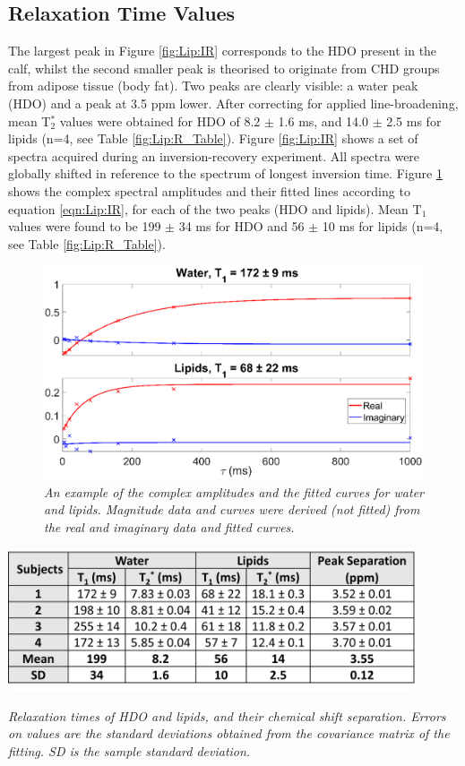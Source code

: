 \documentclass[class=article, crop=false]{standalone}
\begin{document}
\subsection{Relaxation Time Values}

The largest peak in Figure \ref{fig:Lip:IR} corresponds to the HDO present in the calf, whilst the second smaller peak is theorised to originate from CHD groups from adipose tissue (body fat). Two peaks are clearly visible: a water peak (HDO) and a peak at 3.5 ppm lower. After correcting for applied line-broadening, mean T$_2^*$ values were obtained for HDO of 8.2 $\pm$ 1.6 ms, and 14.0 $\pm$ 2.5 ms for lipids (n=4, see Table \ref{fig:Lip:R_Table}). Figure \ref{fig:Lip:IR} shows a set of spectra acquired during an inversion-recovery experiment. All spectra were globally shifted in reference to the spectrum of longest inversion time. Figure \ref{fig:Lip:Amp_Tau} shows the complex spectral amplitudes and their fitted lines according to equation \ref{eqn:Lip:IR}, for each of the two peaks (HDO and lipids). Mean T$_1$ values were found to be 199 $\pm$ 34 ms for HDO and 56 $\pm$ 10 ms for lipids (n=4, see Table \ref{fig:Lip:R_Table}).

\begin{figure}
    \centering
    \includegraphics[width=1\textwidth]{Figures/Lipid/Amp_Tau.png}
    \caption{\textit{An example of the complex amplitudes and the fitted curves for water and lipids. Magnitude data and curves were derived (not fitted) from the real and imaginary data and fitted curves.}}
    \label{fig:Lip:Amp_Tau}
\end{figure}

\begin{table}
    \centering
    \includegraphics[width=0.9\textwidth]{Figures/Lipid/Relaxation_Table.png}
    \caption{\textit{Relaxation times of HDO and lipids, and their chemical shift separation. Errors on values are the standard deviations obtained from the covariance matrix of the fitting. SD is the sample standard deviation.}}
    \label{fig:Lip:R_Table}
\end{table}
\end{document}
